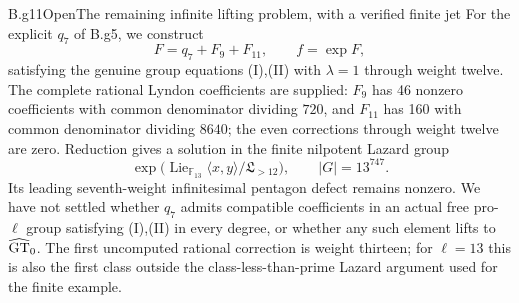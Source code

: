\begin{claim}{B.g11}{Open}{The remaining infinite lifting problem, with a verified finite jet}
For the explicit $q_7$ of B.g5, we construct
\[
 F=q_7+F_9+F_{11},\qquad f=\exp F,
\]
satisfying the genuine group equations (I),(II) with $\lambda=1$
through weight twelve.  The complete rational Lyndon coefficients
are supplied: $F_9$ has 46 nonzero coefficients with common denominator
dividing $720$, and $F_{11}$ has 160 with common denominator dividing
$8640$; the even corrections through weight twelve are zero.
Reduction gives a solution in the finite nilpotent Lazard group
\[
 \exp\bigl(\operatorname{Lie}_{\mathbb F_{13}}\langle x,y\rangle/
                 \mathfrak L_{>12}\bigr),
 \qquad |G|=13^{747}.
\]
Its leading seventh-weight infinitesimal pentagon defect remains
nonzero.  We have not settled whether $q_7$ admits compatible
coefficients in an actual free pro-$\ell$ group satisfying (I),(II)
in every degree, or whether any such element lifts to $\widehat{\mathrm{GT}}_0$.
The first uncomputed rational correction is weight thirteen; for
$\ell=13$ this is also the first class outside the class-less-than-prime
Lazard argument used for the finite example.
\end{claim}

